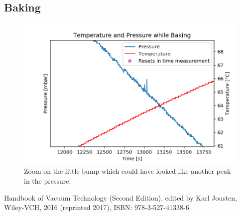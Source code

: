 \documentclass[]{article}
\begin{document}
\subsection{Baking}
\begin{figure}[!h]
\centering\includegraphics[width=.5\textwidth]{Plots/FluktuationBaking.png}
\caption{Zoom on the little bump which could have looked like another peak in the pressure.}
\label{fig::bump}
\end{figure}


\newpage
\begin{thebibliography}{9}

 Handbook of Vacuum Technology (Second Edition), edited by Karl Jousten, Wiley-VCH, 2016 (reprinted 2017), ISBN: 978-3-527-41338-6

\end{thebibliography}
\end{document}
